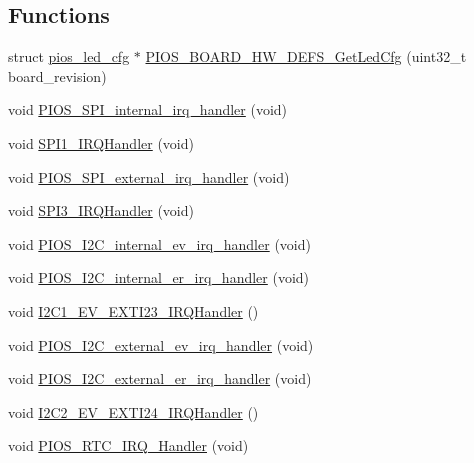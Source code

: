 \subsection*{\-Functions}
\begin{DoxyCompactItemize}
\item 
struct \hyperlink{structpios__led__cfg}{pios\-\_\-led\-\_\-cfg} $\ast$ \hyperlink{group___flying_f3_gafb76ae90816003eabf1d90feff7b1a52}{\-P\-I\-O\-S\-\_\-\-B\-O\-A\-R\-D\-\_\-\-H\-W\-\_\-\-D\-E\-F\-S\-\_\-\-Get\-Led\-Cfg} (uint32\-\_\-t board\-\_\-revision)
\item 
void \hyperlink{group___flying_f3_gadd81747bc7852eee80cd698bf1ba8a65}{\-P\-I\-O\-S\-\_\-\-S\-P\-I\-\_\-internal\-\_\-irq\-\_\-handler} (void)
\item 
void \hyperlink{group___flying_f3_ga9bbd8c17ce4f49adcca47d11f482aab6}{\-S\-P\-I1\-\_\-\-I\-R\-Q\-Handler} (void)
\item 
void \hyperlink{group___flying_f3_ga2191ba46fba76c5f52db81c6650b8822}{\-P\-I\-O\-S\-\_\-\-S\-P\-I\-\_\-external\-\_\-irq\-\_\-handler} (void)
\item 
void \hyperlink{group___flying_f3_ga82987561e28d02b184ecb0515a5e5d2b}{\-S\-P\-I3\-\_\-\-I\-R\-Q\-Handler} (void)
\item 
void \hyperlink{group___flying_f3_gad333f8aeebdfbaca768540198dbc3520}{\-P\-I\-O\-S\-\_\-\-I2\-C\-\_\-internal\-\_\-ev\-\_\-irq\-\_\-handler} (void)
\item 
void \hyperlink{group___flying_f3_gadc581b03bb219d9dfa3e43f594ae3c94}{\-P\-I\-O\-S\-\_\-\-I2\-C\-\_\-internal\-\_\-er\-\_\-irq\-\_\-handler} (void)
\item 
void \hyperlink{group___flying_f3_ga40edacd7797186e686829d1c3b43f4bc}{\-I2\-C1\-\_\-\-E\-V\-\_\-\-E\-X\-T\-I23\-\_\-\-I\-R\-Q\-Handler} ()
\item 
void \hyperlink{group___flying_f3_ga33cea9816e9b3737078525aa4f4bcbd2}{\-P\-I\-O\-S\-\_\-\-I2\-C\-\_\-external\-\_\-ev\-\_\-irq\-\_\-handler} (void)
\item 
void \hyperlink{group___flying_f3_ga1842ef1e30198af0f72d5a0b55420682}{\-P\-I\-O\-S\-\_\-\-I2\-C\-\_\-external\-\_\-er\-\_\-irq\-\_\-handler} (void)
\item 
void \hyperlink{group___flying_f3_ga860bdffadc546e3969c31b9b00c5d29c}{\-I2\-C2\-\_\-\-E\-V\-\_\-\-E\-X\-T\-I24\-\_\-\-I\-R\-Q\-Handler} ()
\item 
void \hyperlink{group___flying_f3_gadc73bf2eccd9d9ff9d8efedd1e743704}{\-P\-I\-O\-S\-\_\-\-R\-T\-C\-\_\-\-I\-R\-Q\-\_\-\-Handler} (void)
\item 

\end{DoxyCompactItemize}
